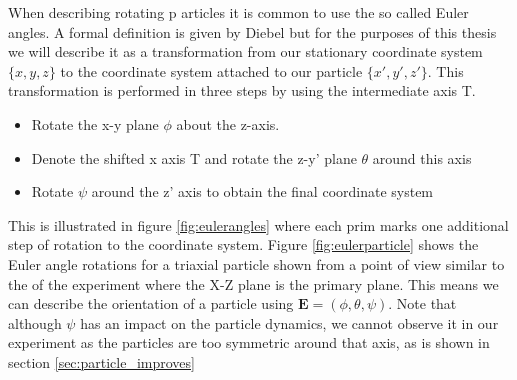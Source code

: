 When describing rotating p	articles it is common to use the so called Euler angles. A formal definition is given by Diebel \cite{Euler} but for the purposes of this thesis we will describe it as a transformation from our stationary coordinate system $\{x,y,z\}$ to the coordinate system attached to our particle $\{x',y',z'\}$. This transformation is performed in three steps by using the intermediate axis T.

\begin{itemize}
\item Rotate the x-y plane $\phi$ about the z-axis.
\item Denote the shifted x axis T and rotate the z-y' plane $\theta$ around this axis
\item Rotate $\psi$ around the z' axis to obtain the final coordinate system
\end{itemize}

This is illustrated in figure \ref{fig:eulerangles} where each prim marks one additional step of rotation to the coordinate system. Figure \ref{fig:eulerparticle} shows the Euler angle rotations for a triaxial particle shown from a point of view similar to the of the experiment where the X-Z plane is the primary plane. This means we can describe the orientation of a particle using $\mathbf{E} = (\phi, \theta, \psi)$. Note that although $\psi$ has an impact on the particle dynamics, we cannot observe it in our experiment as the particles are too symmetric around that axis, as is shown in section \ref{sec:particle_improves}


